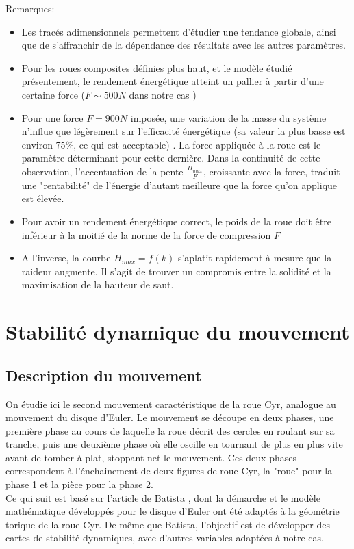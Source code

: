 Remarques:
\begin{itemize}
    \item Les tracés adimensionnels permettent d'étudier une tendance globale, ainsi que de s'affranchir de la dépendance des résultats avec les autres paramètres.
    \item Pour les roues composites définies plus haut, et le modèle étudié présentement, le rendement énergétique atteint un pallier à partir d'une certaine force ($F \sim 500 N$ dans notre cas )
    \item Pour une force $F=900 N$ imposée, une variation de la masse du système n'influe que légèrement sur l'efficacité énergétique (sa valeur la plus basse est environ 75$\%$, ce qui est acceptable) . La force appliquée à la roue est le paramètre déterminant pour cette dernière. Dans la continuité de cette observation, l'accentuation de la pente $\frac{H_{max}}{F}$, croissante avec la force, traduit une "rentabilité" de l'énergie d'autant meilleure que la force qu'on applique est élevée.
    \item Pour avoir un rendement énergétique correct, le poids de la roue doit être inférieur à la moitié de la norme de la force de compression $F$
    \item A l'inverse, la courbe $H_{max}=f(k)$ s'aplatit rapidement à mesure que la raideur augmente. Il s'agit de trouver un compromis entre la solidité et la maximisation de la hauteur de saut.
\end{itemize}


\section{Stabilité dynamique du mouvement}
\subsection{Description du mouvement}
On étudie ici le second mouvement caractéristique de la roue Cyr, analogue au mouvement du disque d'Euler. Le mouvement se découpe en deux phases, une première phase au cours de laquelle la roue décrit des cercles en roulant sur sa tranche, puis une deuxième phase où elle oscille en tournant de plus en plus vite avant de tomber à plat, stoppant net le mouvement. Ces deux phases correspondent à l'énchainement de deux figures de roue Cyr, la "roue" pour la phase 1 et la pièce pour la phase 2. \\
Ce qui suit est basé sur l'article de Batista \cite{Batista}, dont la démarche et le modèle mathématique développés pour le disque d'Euler ont été adaptés à la géométrie torique de la roue Cyr. De même que Batista, l'objectif est de développer des cartes de stabilité dynamiques, avec d'autres variables adaptées à notre cas.

